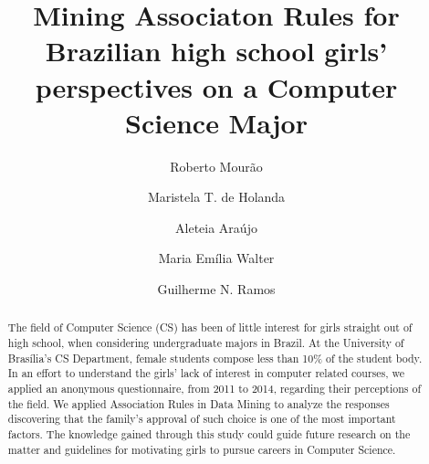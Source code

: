 \documentclass{llncs}
\begin{document}
%
\title{Mining Associaton Rules for Brazilian high school girls' perspectives on a Computer Science Major}%
%
\author{Roberto Mourão
\and Maristela T. de Holanda%
\and Aleteia Araújo%
\and Maria Emília Walter%
\and Guilherme N. Ramos}%

%

\maketitle%

\begin{abstract}%
The field of Computer Science (CS) has been of little interest for girls straight out of high school, when considering undergraduate majors in Brazil. At the University of Brasília’s CS Department, female students compose less than 10\% of the student body. In an effort to understand the girls’ lack of interest in computer related courses, we applied an anonymous questionnaire, from 2011 to 2014, regarding their perceptions of the field. We applied Association Rules in Data Mining to analyze the responses discovering that the family's approval of such choice is one of the most important factors. The knowledge gained through this study could guide future research on the matter and guidelines for motivating girls to pursue careers in Computer Science.


%
\end{abstract}%

%
%
%
%
%

%
%
\end{document}
